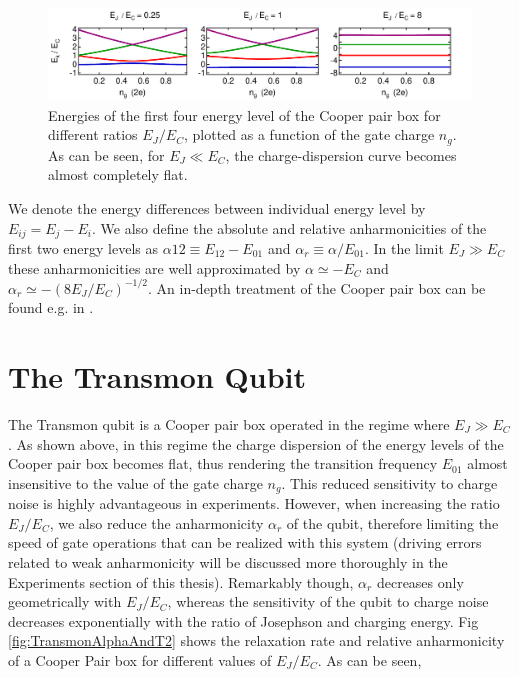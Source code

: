 \begin{figure}[ht!]
	\includegraphics[width=\textwidth]{"./material/mathematica/cooper_pair_box_energies"}
	\caption{Energies of the first four energy level of the Cooper pair box for different ratios $E_J/E_C$, plotted as a function of the gate charge $n_g$. As can be seen, for $E_J \ll E_C$, the charge-dispersion curve becomes almost completely flat.}
	\label{fig:CooperPairBoxEnergies}
\end{figure}

We denote the energy differences between individual energy level by $E_{ij} = E_j - E_i$. We also define the absolute and relative anharmonicities of the first two energy levels as $\alpha{12} \equiv E_{12}-E_{01}$ and $\alpha_r \equiv \alpha / E_{01}$. In the limit $E_J \gg E_C$ these anharmonicities are well approximated by $\alpha \simeq -E_C$ and $\alpha_r \simeq -(8E_J / E_C)^{-1/2}$. An in-depth treatment of the Cooper pair box can be found e.g. in \citep{cottet_implementation_2002} .

\section{The Transmon Qubit}

The Transmon qubit is a Cooper pair box operated in the regime where $E_J \gg E_C$. As shown above, in this regime the charge dispersion of the energy levels of the Cooper pair box becomes flat, thus rendering the transition frequency $E_{01}$ almost insensitive to the value of the gate charge $n_g$. This reduced sensitivity to charge noise is highly advantageous in experiments. However, when increasing the ratio $E_J/E_C$, we also reduce the anharmonicity $\alpha_r$ of the qubit, therefore limiting the speed of gate operations that can be realized with this system (driving errors related to weak anharmonicity will be discussed more thoroughly in the Experiments section of this thesis). Remarkably though, $\alpha_r$ decreases only geometrically with $E_J/E_C$, whereas the sensitivity of the qubit to charge noise decreases exponentially with the ratio of Josephson and charging energy. Fig \ref{fig:TransmonAlphaAndT2} shows the relaxation rate and relative anharmonicity of  a Cooper Pair box for different values of $E_J/E_C$. As can be seen,

